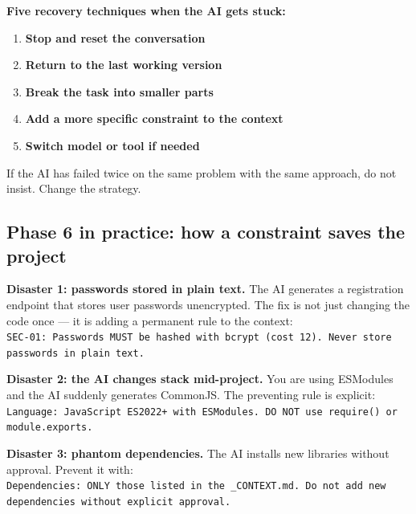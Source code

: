 \begin{warnbox}
\textbf{Five recovery techniques when the AI gets stuck:}
\begin{enumerate}
  \item \textbf{Stop and reset the conversation}
  \item \textbf{Return to the last working version}
  \item \textbf{Break the task into smaller parts}
  \item \textbf{Add a more specific constraint to the context}
  \item \textbf{Switch model or tool if needed}
\end{enumerate}
\end{warnbox}

\begin{tipbox}
If the AI has failed twice on the same problem with the same approach, do not insist. Change the strategy.
\end{tipbox}

\subsection{Phase 6 in practice: how a constraint saves the project}

\begin{dangerbox}
\textbf{Disaster 1: passwords stored in plain text.} The AI generates a registration endpoint that stores user passwords unencrypted. The fix is not just changing the code once --- it is adding a permanent rule to the context:\\[4pt]
\texttt{SEC-01: Passwords MUST be hashed with bcrypt (cost 12). Never store passwords in plain text.}
\end{dangerbox}

\begin{dangerbox}
\textbf{Disaster 2: the AI changes stack mid-project.} You are using ESModules and the AI suddenly generates CommonJS. The preventing rule is explicit:\\[4pt]
\texttt{Language: JavaScript ES2022+ with ESModules. DO NOT use require() or module.exports.}
\end{dangerbox}

\begin{dangerbox}
\textbf{Disaster 3: phantom dependencies.} The AI installs new libraries without approval. Prevent it with:\\[4pt]
\texttt{Dependencies: ONLY those listed in the \_CONTEXT.md. Do not add new dependencies without explicit approval.}
\end{dangerbox}

